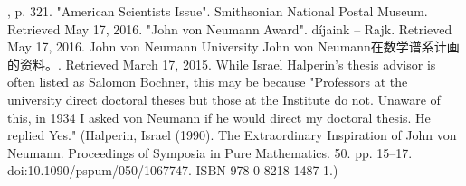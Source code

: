 \begin{enumerate}
, p. 321.
"American Scientists Issue". Smithsonian National Postal Museum. Retrieved May 17, 2016.
"John von Neumann Award". díjaink – Rajk. Retrieved May 17, 2016.
John von Neumann University
John von Neumann在数学谱系计画的资料。. Retrieved March 17, 2015.
While Israel Halperin's thesis advisor is often listed as Salomon Bochner, this may be because "Professors at the university direct doctoral theses but those at the Institute do not. Unaware of this, in 1934 I asked von Neumann if he would direct my doctoral thesis. He replied Yes." (Halperin, Israel (1990). The Extraordinary Inspiration of John von Neumann. Proceedings of Symposia in Pure Mathematics. 50. pp. 15–17. doi:10.1090/pspum/050/1067747. ISBN 978-0-8218-1487-1.)
\end{enumerate}
